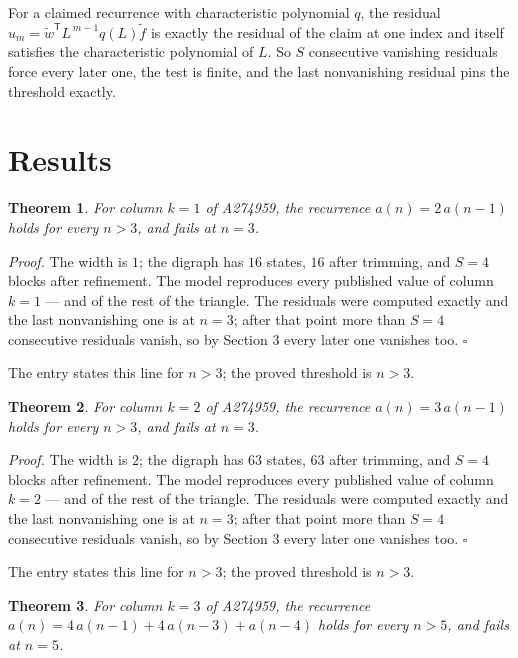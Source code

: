 \documentclass[11pt]{article}
\newtheorem{theorem}{Theorem}
\theoremstyle{definition}
\begin{document}
For a claimed recurrence with characteristic polynomial $q$, the residual $u_m = \tilde w^{\mathsf T}L^{\,m-1}q(L)\tilde f$ is exactly the residual of the claim at one index and itself satisfies the characteristic polynomial of $L$. So $S$ consecutive vanishing residuals force every later one, the test is finite, and the last nonvanishing residual pins the threshold exactly.

\section{Results}

\begin{theorem} For column $k = 1$ of A274959, the recurrence $a(n) = 2\,a(n-1)$ holds for every $n > 3$, and fails at $n = 3$.\end{theorem}

{\itshape Proof.} The width is $1$; the digraph has $16$ states, $16$ after trimming, and $S = 4$ blocks after refinement. The model reproduces every published value of column $k = 1$ --- and of the rest of the triangle. The residuals were computed exactly and the last nonvanishing one is at $n = 3$; after that point more than $S = 4$ consecutive residuals vanish, so by Section 3 every later one vanishes too. $\square$

The entry states this line for $n > 3$; the proved threshold is $n > 3$.

\begin{theorem} For column $k = 2$ of A274959, the recurrence $a(n) = 3\,a(n-1)$ holds for every $n > 3$, and fails at $n = 3$.\end{theorem}

{\itshape Proof.} The width is $2$; the digraph has $63$ states, $63$ after trimming, and $S = 4$ blocks after refinement. The model reproduces every published value of column $k = 2$ --- and of the rest of the triangle. The residuals were computed exactly and the last nonvanishing one is at $n = 3$; after that point more than $S = 4$ consecutive residuals vanish, so by Section 3 every later one vanishes too. $\square$

The entry states this line for $n > 3$; the proved threshold is $n > 3$.

\begin{theorem} For column $k = 3$ of A274959, the recurrence $a(n) = 4\,a(n-1) + 4\,a(n-3) + a(n-4)$ holds for every $n > 5$, and fails at $n = 5$.\end{theorem}
\end{document}
